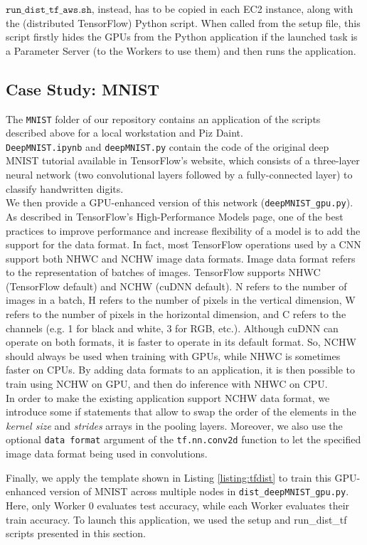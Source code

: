 $\texttt{run\_dist\_tf\_aws.sh}$, instead, has to be copied in each EC2 instance, along with the (distributed TensorFlow) Python script.
When called from the setup file, this script firstly hides the GPUs from the Python application if the launched task is a Parameter Server (to the Workers to use them) and then runs the application.

\subsection{Case Study: MNIST}
The \texttt{MNIST} folder of our repository contains an application of the scripts described above for a local workstation and Piz Daint.\\

\texttt{DeepMNIST.ipynb} and \texttt{deepMNIST.py} contain the code of the original deep MNIST tutorial available in TensorFlow's website, which consists of a three-layer neural network (two convolutional layers followed by a fully-connected layer) to classify handwritten digits.\\

We then provide a GPU-enhanced version of this network (\texttt{deepMNIST\_gpu.py}).\\
As described in TensorFlow's High-Performance Models page, one of the best practices to improve performance and increase flexibility of a model is to add the support for the data format.
In fact, most TensorFlow operations used by a CNN support both NHWC and NCHW image data formats.
Image data format refers to the representation of batches of images. 
TensorFlow supports NHWC (TensorFlow default) and NCHW (cuDNN default). 
N refers to the number of images in a batch, H refers to the number of pixels in the vertical dimension, W refers to the number of pixels in the horizontal dimension, and C refers to the channels (e.g. 1 for black and white, 3 for RGB, etc.). 
Although cuDNN can operate on both formats, it is faster to operate in its default format.
So, NCHW should always be used when training with GPUs, while NHWC is sometimes faster on CPUs.
By adding data formats to an application, it is then possible to train using NCHW on GPU, and then do inference with NHWC on CPU.\\
In order to make the existing application support NCHW data format, we introduce some if statements that allow to swap the order of the elements in the \textit{kernel size} and \textit{strides} arrays in the pooling layers.
Moreover, we also use the optional \texttt{data format} argument of the \texttt{tf.nn.conv2d} function to let the specified image data format being used in convolutions.

Finally, we apply the template shown in Listing \ref{listing:tfdist} to train this GPU-enhanced version of MNIST across multiple nodes in \texttt{dist\_deepMNIST\_gpu.py}.
Here, only Worker 0 evaluates test accuracy, while each Worker evaluates their train accuracy.
To launch this application, we used the setup and run\_dist\_tf scripts presented in this section.